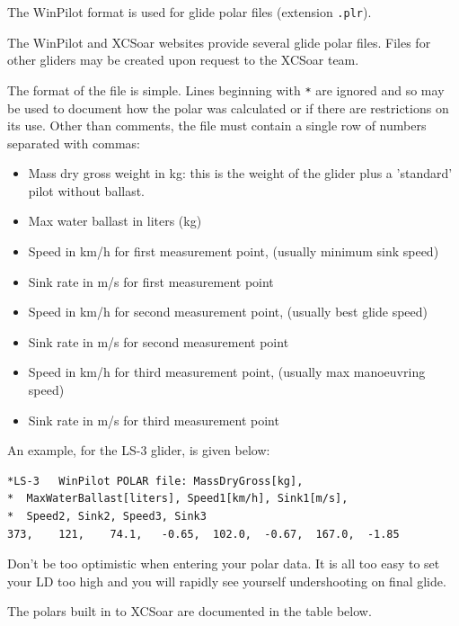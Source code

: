 \documentclass[a4paper,12pt]{refrep}
\begin{document}
The WinPilot format is used for glide polar files (extension \verb|.plr|).

The WinPilot and XCSoar websites provide several glide polar files.
Files for other gliders may be created upon request to the XCSoar
team.

The format of the file is simple.  Lines beginning with \verb|*| are
ignored and so may be used to document how the polar was calculated or
if there are restrictions on its use.  Other than comments, the file
must contain a single row of numbers separated with commas:
\begin{itemize}
\item Mass dry gross weight in kg: this is the weight of the glider plus
  a 'standard' pilot without ballast.
\item Max water ballast in liters (kg)
\item Speed in km/h for first measurement point, (usually minimum sink speed)
\item Sink rate in m/s for first measurement point
\item Speed in km/h for second measurement point, (usually best glide speed)
\item Sink rate in m/s for second measurement point
\item Speed in km/h for third measurement point, (usually max manoeuvring speed)
\item Sink rate in m/s for third measurement point
\end{itemize}

An example, for the LS-3 glider, is given below:
\begin{verbatim}
*LS-3	WinPilot POLAR file: MassDryGross[kg], 
*  MaxWaterBallast[liters], Speed1[km/h], Sink1[m/s], 
*  Speed2, Sink2, Speed3, Sink3  	
373,	121,	74.1,	-0.65,	102.0,	-0.67,	167.0,	-1.85
\end{verbatim}

\tip Don't be too optimistic when entering your polar data. It is all too
easy to set your LD too high and you will rapidly see yourself
undershooting on final glide.

The polars built in to XCSoar are documented in the table below.
\end{document}
